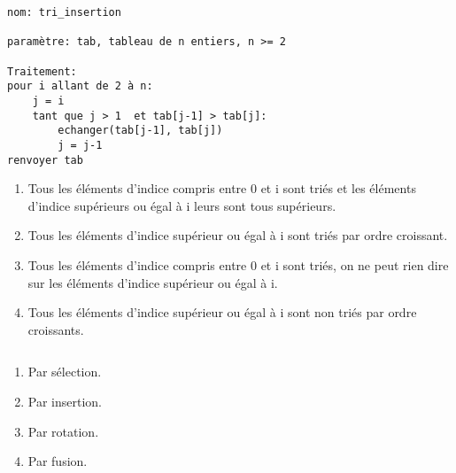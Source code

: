 \begin{lstlisting}
nom: tri_insertion

paramètre: tab, tableau de n entiers, n >= 2

Traitement:
pour i allant de 2 à n:
    j = i
    tant que j > 1  et tab[j-1] > tab[j]:
        echanger(tab[j-1], tab[j])
        j = j-1
renvoyer tab
\end{lstlisting}
\begin{enumerate}
\item Tous les éléments d'indice compris entre 0 et i sont triés et les éléments d'indice supérieurs ou égal à i leurs sont tous supérieurs.
\item Tous les éléments d'indice supérieur ou égal à i sont triés par ordre croissant.
\item Tous les éléments d'indice compris entre 0 et i sont triés, on ne peut rien dire sur les éléments d'indice supérieur ou égal à i. %
\item Tous les éléments d'indice supérieur ou égal à i sont non triés par ordre croissants.
\end{enumerate}

\begin{lstlisting}
\end{lstlisting}
\begin{enumerate}
\item Par sélection.
\item Par insertion.
\item Par rotation. %
\item Par fusion.
\end{enumerate}
